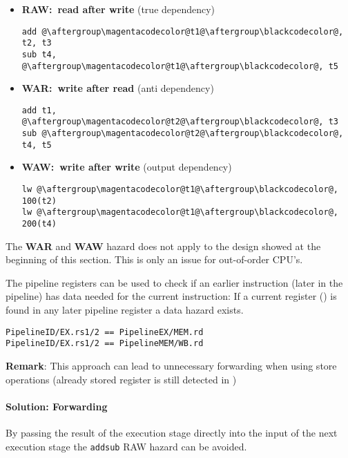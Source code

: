 \begin{itemize}
    \item \textbf{RAW:\ read after write} (true dependency)
          \begin{lstlisting}[escapechar=@]
add @\aftergroup\magentacodecolor@t1@\aftergroup\blackcodecolor@, t2, t3
sub t4, @\aftergroup\magentacodecolor@t1@\aftergroup\blackcodecolor@, t5
\end{lstlisting}
    \item \textbf{WAR:\ write after read} (anti dependency)
          \begin{lstlisting}[escapechar=@]
add t1, @\aftergroup\magentacodecolor@t2@\aftergroup\blackcodecolor@, t3
sub @\aftergroup\magentacodecolor@t2@\aftergroup\blackcodecolor@, t4, t5
\end{lstlisting}
    \item \textbf{WAW:\ write after write} (output dependency)
          \begin{lstlisting}[escapechar=@]
lw @\aftergroup\magentacodecolor@t1@\aftergroup\blackcodecolor@, 100(t2)
lw @\aftergroup\magentacodecolor@t1@\aftergroup\blackcodecolor@, 200(t4)
\end{lstlisting}
\end{itemize}

The \textbf{WAR} and \textbf{WAW} hazard does not apply to the design showed at the beginning of this section. This is only an issue for out-of-order CPU's.

\newpar{}

The pipeline registers can be used to check if an earlier instruction (later in the pipeline) has data needed for the current instruction:
If a current  register () is found in any later pipeline register a data hazard exists.
\begin{lstlisting}
PipelineID/EX.rs1/2 == PipelineEX/MEM.rd
PipelineID/EX.rs1/2 == PipelineMEM/WB.rd
    \end{lstlisting}
\textbf{Remark}: This approach can lead to unnecessary forwarding when using store operations (already stored register is still detected in )

\paragraph{Solution: Forwarding}
By passing the result of the execution stage directly into the input of the next execution stage the \texttt{add}\textleftarrow\texttt{sub} RAW hazard can be avoided.

